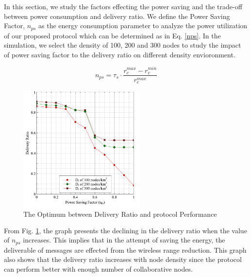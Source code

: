 \documentclass[conference]{IEEEtran}
\begin{document}
In this section, we study the factors effecting the power saving and the trade-off between power consumption and delivery ratio.
We define the Power Saving Factor, $n_{ps}$ as the energy consumption parameter to analyze the power utilization of our proposed protocol which can be determined as in Eq. \ref{nps}.
In the simulation, we select the density of 100, 200 and 300 nodes to study the impact of power saving factor to the delivery ratio on different density envioronment.

\begin{equation}
{ n }_{ ps }={ \tau  }_{ s }\cdot \frac { { r }_{ c }^{ max }-{ r }_{ c }^{ min } }{ { r }_{ c }^{ max } } 
\label{nps}
\end{equation}

\begin{figure}[!t]
\centering
\includegraphics[width=2.5in]{Graphs/NpsDeliveryPerformanceAndDeliveryRatio.pdf}
\caption{The Optimum between Delivery Ratio and protocol Performance}
\label{The Optimum between Delivery Ratio and protocol Performance}
\end{figure}

From Fig. \ref{The Optimum between Delivery Ratio and protocol Performance}, the graph presents the declining in the delivery ratio when the value of $n_{ps}$ increases.
This implies that in the attempt of saving the energy, the deliverable of messages are effected from the wireless range reduction.
This graph also shows that the delivery ratio increases with node density since the protocol can perform better with enough number of collaborative nodes. 



\end{document}

